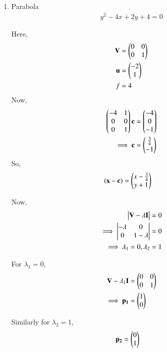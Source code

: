 \begin{enumerate}    
    \item Parabola
    \begin{align}
    y^2-4x+2y+4 = 0
    \end{align}
    
    Here,
    \begin{align}
    \mathbf{V} &= \begin{pmatrix}0 & 0 \\ 0 & 1\end{pmatrix} \\
    \mathbf{u} &= \begin{pmatrix}-2 \\ 1\end{pmatrix} \\
    f &= 4
    \end{align}
    Now,
    \begin{align}
    \begin{pmatrix}-4 & 1 \\ 0 & 0 \\ 0 & 1\end{pmatrix}\mathbf{c} &= \begin{pmatrix}-4 \\ 0 \\ -1\end{pmatrix}
    \\
    \implies \mathbf{c} &= \begin{pmatrix}\frac{3}{4} \\ -1\end{pmatrix}
    \end{align}
    So,
    \begin{align}
    \left(\mathbf{x}-\mathbf{c}\right) &= \begin{pmatrix}x-\frac{3}{4} \\  y+1\end{pmatrix}
    \end{align}
    
    Now,
    \begin{align}
        \begin{vmatrix}\mathbf{V}-\lambda\mathbf{I}\end{vmatrix} &= 0 \\
        \implies \begin{vmatrix}-\lambda & 0 \\ 0 & 1-\lambda\end{vmatrix} &= 0 \\
        \implies \lambda_1 =0,\lambda_2 &= 1
    \end{align}
    
    For $\lambda_1=0$,
    \begin{align}
        \mathbf{V}-\lambda_1\mathbf{I} &= \begin{pmatrix}0 & 0 \\ 0 & 1\end{pmatrix} \\
        \implies \mathbf{p_1} &= \begin{pmatrix}1 \\ 0\end{pmatrix}
    \end{align}
    
    Similarly for $\lambda_2=1$,
    \begin{align}
        \mathbf{p_2} &=\begin{pmatrix}0 \\ 1\end{pmatrix}
    \end{align}
    

\end{enumerate}

